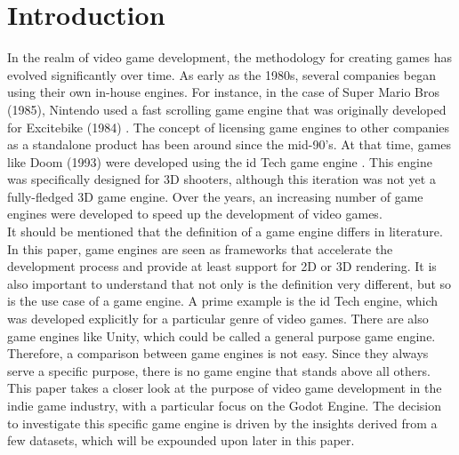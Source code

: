 \section{Introduction}
In the realm of video game development, the methodology for creating games has evolved significantly over time.
As early as the 1980s, several companies began using their own in-house engines.
For instance, in the case of Super Mario Bros (1985), Nintendo used a fast scrolling game engine that was originally developed for Excitebike (1984) \cite{history-digital-games}.
The concept of licensing game engines to other companies as a standalone product has been around since the mid-90's.
At that time, games like Doom (1993) were developed using the id Tech game engine \cite{id-tech-doom}.
This engine was specifically designed for 3D shooters, although this iteration was not yet a fully-fledged 3D game engine.
Over the years, an increasing number of game engines were developed to speed up the development of video games.\\
 
It should be mentioned that the definition of a game engine differs in literature.
In this paper, game engines are seen as frameworks that accelerate the development process and provide at least support for 2D or 3D rendering.
It is also important to understand that not only is the definition very different, but so is the use case of a game engine.
A prime example is the id Tech engine, which was developed explicitly for a particular genre of video games.
There are also game engines like Unity, which could be called a general purpose game engine.
Therefore, a comparison between game engines is not easy.
Since they always serve a specific purpose, there is no game engine that stands above all others.
This paper takes a closer look at the purpose of video game development in the indie game industry, with a particular focus on the Godot Engine.
The decision to investigate this specific game engine is driven by the insights derived from a few datasets, which will be expounded upon later in this paper.
